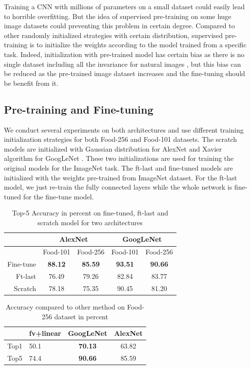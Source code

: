 ﻿Training a CNN with millions of parameters on a small dataset could easily lead to horrible overfitting. But the idea of supervised pre-training on some huge image datasets could preventing this problem in certain degree. Compared to other randomly initialized strategies with certain distribution, supervised pre-training is to initialize the weights according to the model trained from a specific task. Indeed, initialization with pre-trained model has certain bias as there is no single dataset including all the invariance for natural images \cite{agrawal2014analyzing}, but this bias can be reduced as the pre-trained image dataset increases and the fine-tuning should be benefit from it.
\subsection{Pre-training and Fine-tuning}
We conduct several experiments on both architectures and use different training initialization strategies for both Food-256 and Food-101 datasets. The scratch models are initialized with Gaussian distribution for AlexNet and Xavier algorithm for GoogLeNet%
 \cite{glorot2010understanding}. These two initializations are used for training the original models for the ImageNet task. The ft-last and fine-tuned models are initialized with the weights pre-trained from ImageNet dataset. For the ft-last model, we just re-train the fully connected layers while the whole network is fine-tuned for the fine-tune model.
\begin{table}[htbp]
  \centering
  \caption{Top-5 Accuracy in percent on fine-tuned, ft-last and scratch model for two architectures}
    \begin{tabular}{r|cc|cc}
    \toprule
          & \multicolumn{2}{c|}{AlexNet} & \multicolumn{2}{c}{GoogLeNet} \\    \midrule
     & Food-101   & Food-256   & Food-101   & Food-256 \\
    Fine-tune & \textbf{88.12} & \textbf{85.59} & \textbf{93.51} & \textbf{90.66} \\
    Ft-last &76.49	&79.26&	82.84	&83.77\\
    Scratch & 78.18 & 75.35 & 90.45 & 81.20 \\
    \bottomrule
    \end{tabular}%
  \label{tab:ft}%
\end{table}%


\begin{table}[htbp]
  \centering
  \caption{Accuracy compared to other method on Food-256 dataset in percent}
    \begin{tabular}{cC{3cm}cc}
    \toprule
     & fv+linear \cite{Kawano:2014} & GoogLeNet & AlexNet \\
     
    \midrule
    Top1  & 50.1& \textbf{70.13} & 63.82 \\
    Top5  & 74.4  & \textbf{90.66} & 85.59\\
    \bottomrule
    \end{tabular}%
  \label{tab:256}%
\end{table}%

